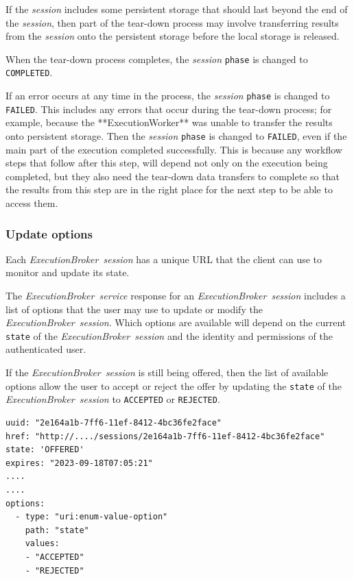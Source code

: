 \documentclass[11pt,a4paper]{ivoa}
\newcommand{\execworkerclass} {**ExecutionWorker**}
\newcommand{\execbrokerservice}[1] {\textit{ExecutionBroker~service#1}}
\newcommand{\execsession}[1] {\textit{ExecutionBroker~session#1}}
\newcommand{\workerjob}[1] {\textit{session#1}}
\newcommand{\teardown} {tear-down}
\newcommand{\codeword}[1] {\texttt{#1}}
\begin{document}
If the \workerjob{} includes some persistent storage that should last beyond the end of the \workerjob{},
then part of the \teardown{} process may involve transferring results from the \workerjob{}
onto the persistent storage before the local storage is released.

When the \teardown{} process completes, the \workerjob{} \codeword{phase} is changed to \codeword{COMPLETED}.

If an error occurs at any time in the process, the \workerjob{} \codeword{phase} is changed to \codeword{FAILED}.
This includes any errors that occur during the \teardown{} process; for example, because
the \execworkerclass{} was unable to transfer the results onto persistent storage.
Then the \workerjob{} \codeword{phase} is changed to \codeword{FAILED}, even if the main part of the
execution completed successfully.
This is because any workflow steps that follow after this step, will depend not only on the execution being
completed, but they also need the \teardown{} data transfers to complete so that the results from this step
are in the right place for the next step to be able to access them.


\subsubsection{Update options}
\label{subsub-update-options}

Each \execsession{} has a unique URL that the client can use to monitor and update
its state.

The \execbrokerservice{} response for an \execsession{} includes a list of options
that the user may use to update or modify the \execsession{}.
Which options are available will depend on the current \codeword{state} of the
\execsession{} and the identity and permissions of the authenticated user.

If the \execsession{} is still being offered, then the list of available options
allow the user to accept or reject the offer by updating the \codeword{state} of
the \execsession{} to \codeword{ACCEPTED} or \codeword{REJECTED}.

\begin{lstlisting}[]
uuid: "2e164a1b-7ff6-11ef-8412-4bc36fe2face"
href: "http://..../sessions/2e164a1b-7ff6-11ef-8412-4bc36fe2face"
state: 'OFFERED'
expires: "2023-09-18T07:05:21"
....
....
options:
  - type: "uri:enum-value-option"
    path: "state"
    values:
    - "ACCEPTED"
    - "REJECTED"
\end{lstlisting}
\end{document}

